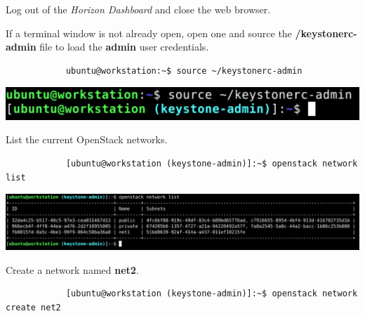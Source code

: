 \documentclass[letterpaper, 12pt]{article}
\begin{document}
\begin{enumerate}
    \begin{labstep}
        Log out of the \textit{Horizon Dashboard} and close the web browser.
    \end{labstep}

    \begin{labstep}
        If a terminal window is not already open, open one and source the \textbf{\texttildemid/keystonerc-admin} file to load the \textbf{admin} user credentials.
        \begin{lstlisting}
            ubuntu@workstation:~$ source ~/keystonerc-admin
        \end{lstlisting}

        \begin{center}
            \includegraphics[width=\linewidth]{images/part3/step12.png}
        \end{center}
    \end{labstep}

    \begin{labstep}
        List the current OpenStack networks.
        \begin{lstlisting}
            [ubuntu@workstation (keystone-admin)]:~$ openstack network list
        \end{lstlisting}

        \begin{center}
            \includegraphics[width=\linewidth]{images/part3/step13.png}
        \end{center}
    \end{labstep}

    \begin{labstep}
        Create a network named \textbf{net2}.
        \begin{lstlisting}
            [ubuntu@workstation (keystone-admin)]:~$ openstack network create net2
        \end{lstlisting}


\end{labstep}
\end{enumerate}
\end{document}
